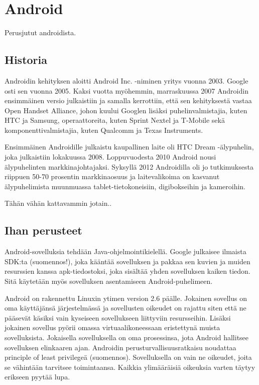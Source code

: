 \section{Android}

Perusjutut androidista.

\subsection{Historia}

Androidin kehityksen aloitti Android Inc. -niminen yritys vuonna 2003. Google osti sen vuonna 2005. Kaksi vuotta myöhemmin, marraskuussa 2007 Androidin ensimmäinen versio julkaistiin ja samalla kerrottiin, että sen kehityksestä vastaa Open Handset Alliance, johon kuului Googlen lisäksi puhelinvalmistajia, kuten HTC ja Samsung, operaattoreita, kuten Sprint Nextel ja T-Mobile sekä komponenttivalmistajia, kuten Qualcomm ja Texas Instruments.

Ensimmäinen Androidille julkaistu kaupallinen laite oli HTC Dream -älypuhelin, joka julkaistiin lokakuussa 2008.
Loppuvuodesta 2010 Android nousi älypuhelinten markkinajohtajaksi. Syksyllä 2012 Androidilla oli jo tutkimuksesta riippuen 50-70 prosentin markkinaosuus ja laitevalikoima on kasvanut älypuhelimista muunmuassa tablet-tietokoneisiin, digibokseihin ja kameroihin.\cite{wikiandroid}

Tähän vähän kattavammin jotain..

\subsection{Ihan perusteet}

Android-sovelluksia tehdään Java-ohjelmointikielellä. Google julkaisee ilmaista SDK:ta (suomennos!), joka kääntää sovelluksen ja pakkaa sen kuvien ja muiden resurssien kanssa apk-tiedostoksi, joka sisältää yhden sovelluksen kaiken tiedon. Sitä käytetään myös sovelluksen asentamiseen Android-puhelimeen.

Android on rakennettu Linuxin ytimen version 2.6 päälle. Jokainen sovellus on oma käyttäjänsä järjestelmässä ja sovellusten oikeudet on rajattu siten että ne pääsevät käsiksi vain kyseiseen sovellukseen liittyviin resursseihin. Lisäksi jokainen sovellus pyörii omassa virtuaalikoneessaan eristettynä muista sovelluksista. Jokaisella sovelluksella on oma prosessinsa, jota Android hallitsee sovelluksen elinkaaren ajan. Androidin perusturvallisuusratkaisu noudattaa principle of least privilegeä (suomennos). Sovelluksella on vain ne oikeudet, joita se vähintään tarvitsee toimintaansa. Kaikkia ylimääräisiä oikeuksia varten täytyy erikseen pyytää lupa.

